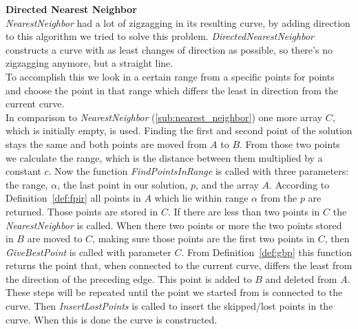   \noindent\large\textbf{Directed Nearest Neighbor}\\
        \textit{NearestNeighbor} had a lot of zigzagging in its resulting curve, by adding direction to this algorithm we tried to solve this problem. \textit{DirectedNearestNeighbor} constructs a curve with as least changes of direction as possible, so there's no zigzagging anymore, but a straight line.\\
        To accomplish this we look in a certain range from a specific points for points and choose the point in that range which differs the least in direction from the current curve.\\
        In comparison to \textit{NearestNeighbor} (\ref{sub:nearest_neighbor}) one more array $C$, which is initially empty, is used. Finding the first and second point of the solution stays the same and both points are moved from $A$ to $B$. From those two points we calculate the range, which is the distance between them multiplied by a constant $c$. Now the function \textit{FindPointsInRange} is called with three parameters: the range, $\alpha$, the last point in our solution, $p$, and the array $A$. According to Definition~\ref{def:fpir} all points in $A$ which lie within range $\alpha$ from the $p$ are returned. Those points are stored in $C$. If there are less than two points in $C$ the \textit{NearestNeighbor} is called. When there two points or more the two points stored in $B$ are moved to $C$, making sure those points are the first two points in $C$, then \textit{GiveBestPoint} is called with parameter $C$. From Definition~\ref{def:gbp} this function returns the point that, when connected to the current curve, differs the least from the direction of the preceding edge. This point is added to $B$ and deleted from $A$. These steps will be repeated until the point we started from is connected to the curve. Then \textit{InsertLostPoints} is called to insert the skipped/lost points in the curve. When this is done the curve is constructed.

